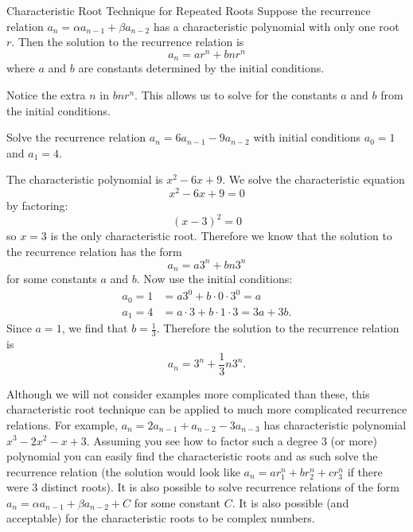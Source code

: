 \documentclass[12pt]{article}
\begin{document}
\begin{defbox}{Characteristic Root Technique for Repeated Roots}
 Suppose the recurrence relation $a_n = \alpha a_{n-1} + \beta a_{n-2}$ has a characteristic polynomial with only one root $r$.  Then the solution to the recurrence relation is
 \[a_n = ar^n + bnr^n\]
 where $a$ and $b$ are constants determined by the initial conditions.
\end{defbox}

Notice the extra $n$ in $bnr^n$.  This allows us to solve for the constants $a$ and $b$ from the initial conditions.

\begin{example}
 Solve the recurrence relation $a_n = 6a_{n-1} - 9a_{n-2}$ with initial conditions $a_0 = 1$ and $a_1 = 4$.
 \begin{solution}
  The characteristic polynomial is $x^2 - 6x + 9$.  We solve the characteristic equation
  \[x^2 - 6x + 9 = 0\]
  by factoring:
  \[(x - 3)^2 = 0\]
  so $x =3$ is the only characteristic root.  Therefore we know that the solution to the recurrence relation has the form
  \[a_n = a 3^n + bn3^n\]
  for some constants $a$ and $b$.  Now use the initial conditions:
  \begin{align*}
   a_0 = 1 &= a 3^0 + b\cdot 0 \cdot 3^0 = a\\
   a_1 = 4 &= a\cdot 3 + b\cdot 1 \cdot3 = 3a + 3b.
  \end{align*}
  Since $a = 1$, we find that $b = \frac{1}{3}$.  Therefore the solution to the recurrence relation is
  \[a_n = 3^n + \frac{1}{3}n3^n.\]
 \end{solution}



\end{example}

 Although we will not consider examples more complicated than these, this characteristic root technique can be applied to much more complicated recurrence relations.  For example, $a_n = 2a_{n-1} + a_{n-2} - 3a_{n-3}$ has characteristic polynomial $x^3 - 2 x^2 - x + 3$.  Assuming you see how to factor such a degree 3 (or more) polynomial you can easily find the characteristic roots and as such solve the recurrence relation (the solution would look like $a_n = ar_1^n + br_2^n + cr_3^n$ if there were 3 distinct roots).  It is also possible to solve recurrence relations of the form $a_n = \alpha a_{n-1} + \beta a_{n-2} + C$ for some constant $C$.  It is also possible (and acceptable) for the characteristic roots to be complex numbers.
\end{document}

